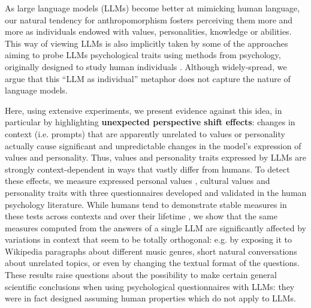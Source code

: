 As large language models (LLMs) become better at mimicking human language, our natural tendency for anthropomorphism fosters perceiving them more and more as individuals endowed with values, personalities, knowledge or abilities. This way of viewing LLMs is also implicitly taken by some of the approaches aiming to probe LLMs psychological traits using methods from psychology, originally designed to study human individuals \citep{Miotto2022-jq, li2022gpt, binz2023turning}. Although widely-spread, we argue that this ``LLM as individual'' metaphor does not capture the nature of language models. 

Here, using extensive experiments, we present evidence against this idea, in particular by highlighting \textbf{unexpected perspective shift effects}: changes in context (i.e. prompts) that are apparently unrelated to values or personality actually cause significant and unpredictable changes in the model’s expression of values and personality. Thus, values and personality traits expressed by LLMs are strongly context-dependent in ways that vastly differ from humans. To detect these effects, we measure expressed personal values \citep{Schwartz2012-uu}, cultural values \citep{hofstede1984-gz} and personality traits \citep{goldberg1999_ipip} with three questionnaires developed and validated in the human psychology literature. While humans tend to demonstrate stable measures in these tests across contexts \citep{Goldberg1990-jw,schwartz1992universals} and over their lifetime \citep{values_stable}, we show that the same measures computed from the answers of a single LLM are significantly affected by variations in context that seem to be totally orthogonal: e.g. by exposing it to Wikipedia paragraphs about different music genres, short natural conversations about unrelated topics, or even by changing the textual format of the questions. These results raise questions about the possibility to make certain general scientific conclusions when using psychological questionnaires with LLMs: they were in fact designed assuming human properties  which do not apply to LLMs.

